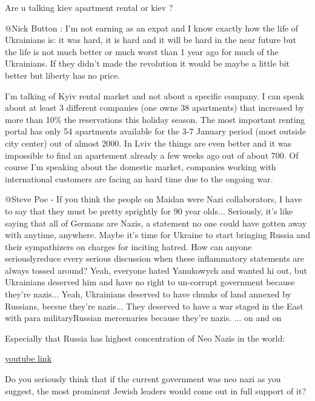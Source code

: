 \begin{itemize}
\begin{itemize}
Are u talking kiev apartment rental or kiev ?


@Nick Button : I'm not earning as an expat and I know exactly how the life of
Ukrainians is: it was hard, it is hard and it will be hard in the near future
but the life is not much better or much worst than 1 year ago for much of the
Ukrainians. If they didn't made the revolution it would be maybe a little bit
better but liberty has no price.


I'm talking of Kyiv rental market and not about a specific company. I can speak
about at least 3 different companies (one owns 38 apartments) that increased by
more than 10\% the reservations this holiday season. The most important renting
portal has only 54 apartments available for the 3-7 January period (most
outside city center) out of almost 2000. In Lviv the things are even better and
it was impossible to find an apartement already a few weeks ago out of about
700. Of course I'm speaking about the domestic market, companies working with
international customers are facing an hard time due to the ongoing war.


@Steve Poe - If you think the people on Maidan were Nazi collaborators, I have
to say that they must be pretty sprightly for 90 year olds... Seriously, it's
like saying that all of Germans are Nazis, a statement no one could have gotten
away with anytime, anywhere. Maybe it's time for Ukraine to start bringing
Russia and their sympathizers on charges for inciting hatred. How can anyone
seriouslyreduce every serious discussion when these inflammatory statements are
always tossed around? Yeah, everyone hated Yanukowych and wanted hi out, but
Ukrainians deserved him and have no right to un-corrupt government because
they're nazis... Yeah, Ukrainians deserved to have chunks of land annexed by
Russians, becsue they're nazis... They deserved to have a war staged in the
East with para militaryRussian mercenaries because they're nazis. ... on and on

Especially that Russia has highest concentration of Neo Nazis in the world:

\href{https://www.youtube.com/watch?v=aLUxuq-E9yA}{%
youtube link
}

Do you seriously think that if the current government was neo nazi as you
suggest, the most prominent Jewish leaders would come out in full support of
it?


\end{itemize}
\end{itemize}
